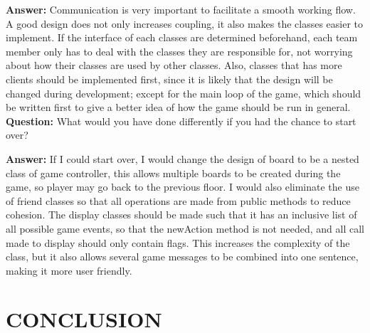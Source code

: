\documentclass[11pt]{article}
\theoremstyle{plain} \newtheorem{theorem*}{Theorem}[subsection]
\begin{document}
\textbf{Answer:}
Communication is very important to facilitate a smooth working flow. A good
design does not only increases coupling, it also makes the classes easier to
implement. If the interface of each classes are determined beforehand, each
team member only has to deal with the classes they are responsible for, not
worrying about how their classes are used by other classes. Also, classes
that has more clients should be implemented first, since it is likely that the
design will be changed during development; except for the main loop of the
game, which should be written first to give a better idea of how the game
should be run in general.  \\

\textbf{Question:}
What would you have done differently if you had the chance to start over? 

\textbf{Answer:}
If I could start over, I would change the design of board to be a nested class
of game controller, this allows multiple boards to be created during the game,
so player may go back to the previous floor. I would also eliminate the use of
friend classes so that all operations are made from public methods to reduce
cohesion. The display classes should be made such that it has an inclusive list
of all possible game events, so that the newAction method is not needed, and
all call made to display should only contain flags. This increases the
complexity of the class, but it also allows several game messages to be
combined into one sentence, making it more user friendly.  \\




\section{CONCLUSION}
\end{document}
